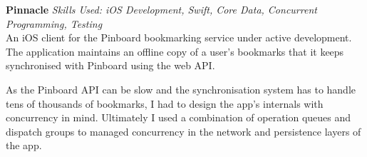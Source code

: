 \textbf{Pinnacle}  \newline
\textit{Skills Used: iOS Development, Swift, Core Data, Concurrent Programming, Testing} \\
An iOS client for the Pinboard bookmarking service under active development. The
application maintains an offline copy of a user's bookmarks that it keeps
synchronised with Pinboard using the web API.

As the Pinboard API can be slow and the synchronisation system has to handle
tens of thousands of bookmarks, I had to design the app's internals with
concurrency in mind. Ultimately I used a combination of operation queues and
dispatch groups to managed concurrency in the network and persistence layers of
the app.

